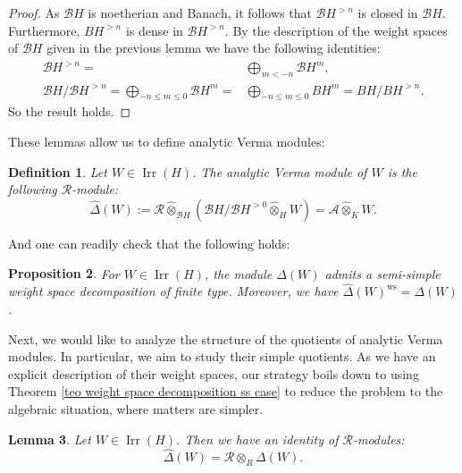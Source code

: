 \documentclass{amsart}
\newtheorem{defi}{ Definition}[subsection]
\newtheorem{prop}[defi]{ Proposition}
\newtheorem{Lemma}[defi]{Lemma}
\begin{document}
\begin{proof}
As $\mathscr{B}H$ is noetherian and Banach, it follows that $\mathscr{B}H^{>n}$ is closed in $\mathscr{B}H$. Furthermore, $BH^{>n}$ is dense in $\mathscr{B}H^{>n}$. By the description of the weight spaces of $\mathscr{B}H$ given in the previous lemma we have the following identities:
\begin{align*}  \mathscr{B}H^{>n}=&\widehat{\bigoplus}_{m< -n}\mathscr{B}H^m, \\\mathscr{B}H/\mathscr{B}H^{>n}=\bigoplus_{-n \leq m\leq 0}\mathscr{B}H^m=&\bigoplus_{-n \leq m\leq 0}BH^m=BH/BH^{>n}.
\end{align*}
So the result holds.
\end{proof}
These lemmas allow us to define analytic Verma modules:
\begin{defi}
Let $W\in \operatorname{Irr}(H)$. The analytic Verma module of $W$ is the following $\mathscr{R}$-module:
\begin{equation*}
    \widehat{\Delta}(W):= \mathscr{R}\widehat{\otimes}_{\mathscr{B}H}\left(\mathscr{B}H/\mathscr{B}H^{>0}\widehat{\otimes}_{H} W \right)=\mathscr{A}\widehat{\otimes}_KW.
\end{equation*}
\end{defi}
And one can readily check that the following holds:
\begin{prop}\label{prop ws analytic verma}
For $W\in \operatorname{Irr}(H)$, the module $\widehat{\Delta}(W)$ admits a semi-simple weight space decomposition of finite type. Moreover, we have $\widehat{\Delta}(W)^{\operatorname{ws}}=\Delta(W)$.
\end{prop}
Next, we would like to analyze the structure of the quotients of analytic Verma modules. In particular, we aim to study their simple quotients. As we have an explicit description of their weight spaces, our strategy boils down to using Theorem \ref{teo weight space decomposition ss case} to reduce the problem to the algebraic situation, where matters are simpler.
\begin{Lemma}\label{Lemma analytification of Verma}
Let $W\in\operatorname{Irr}(H)$. Then we have an identity of $\mathscr{R}$-modules:
\begin{equation*}
    \widehat{\Delta}(W)=\mathscr{R}\otimes_{R}\Delta(W).
\end{equation*}
\end{Lemma}
\end{document}
